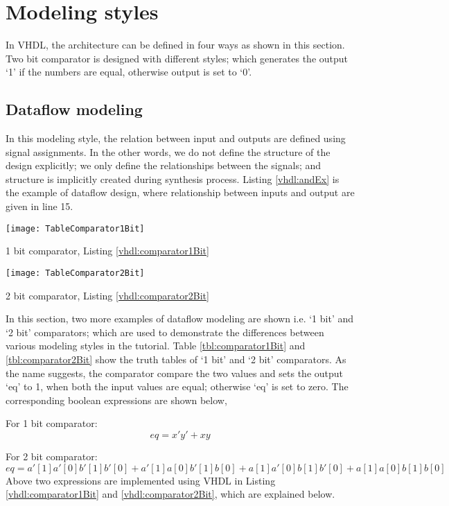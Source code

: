 \section{Modeling styles}
In VHDL, the architecture can be defined in four ways as shown in this section. Two bit comparator is designed with different styles; which generates the output `1' if the numbers are equal, otherwise output is set to `0'.   

\subsection{Dataflow modeling}
In this modeling style, the relation between input and outputs are defined using signal assignments. In the other words, we do not define the structure of the design explicitly; we only define the relationships between the signals; and structure is implicitly created during synthesis process. Listing \ref{vhdl:andEx} is the example of dataflow design, where relationship between inputs and output are given in line 15. 

\begin{table}
	\centering
	\texttt{[image: TableComparator1Bit]}
	\caption{1 bit comparator, Listing \ref{vhdl:comparator1Bit}}
	\label{tbl:comparator1Bit}
\end{table}

\begin{table}
	\centering
	\texttt{[image: TableComparator2Bit]}
	\caption{2 bit comparator, Listing \ref{vhdl:comparator2Bit}}
	\label{tbl:comparator2Bit}
\end{table}

In this section, two more examples of dataflow modeling are shown i.e. `1 bit' and `2 bit' comparators; which are used to demonstrate the differences between various modeling styles in the tutorial. Table \ref{tbl:comparator1Bit} and \ref{tbl:comparator2Bit} show the truth tables of `1 bit' and `2 bit' comparators.  As the name suggests, the comparator compare the two values and sets the output `eq' to 1, when both the input values are equal; otherwise `eq' is set to zero. The corresponding boolean expressions are shown below, 

For 1 bit comparator: 
\begin{equation}
	eq = x' y' + x y
	\label{eq:1bitComparator}
\end{equation} 

For 2 bit comparator: 
\begin{equation}
eq = a'[1]a'[0]b'[1]b'[0] + a'[1]a[0]b'[1]b[0] + a[1]a'[0]b[1]b'[0] + a[1]a[0]b[1]b[0]
	\label{eq:2bitComparator}
\end{equation} 
Above two expressions are implemented using VHDL in Listing \ref{vhdl:comparator1Bit} and \ref{vhdl:comparator2Bit}, which are explained below.

